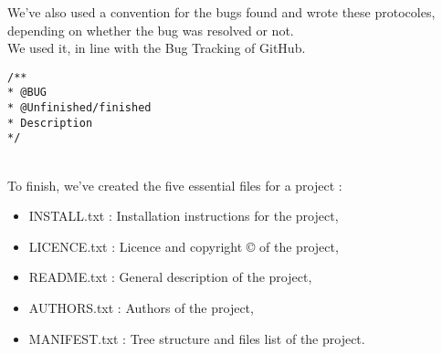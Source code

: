 We've also used a convention for the bugs found and wrote these protocoles, depending on whether the bug was resolved or not.\\
We used it, in line with the Bug Tracking of GitHub.\\

\begin{lstlisting}[frame=trBL, title=Programming convention for bugs]
/**
* @BUG
* @Unfinished/finished
* Description
*/
\end{lstlisting}
~\\

To finish, we've created the five essential files for a project :\\

\begin{itemize}
\item INSTALL.txt  : Installation instructions for the project,
\item LICENCE.txt  : Licence and copyright \copyright{} of the project,
\item README.txt   : General description of the project,
\item AUTHORS.txt  : Authors of the project,
\item MANIFEST.txt : Tree structure and files list of the project.
\end{itemize}
